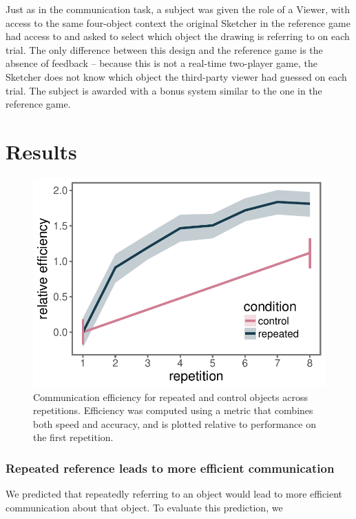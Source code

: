 \documentclass[10pt,letterpaper]{article}
\begin{document}
Just as in the communication task, a subject was given the role of a Viewer, with access to the same four-object context the original Sketcher in the reference game had access to and asked to select which object the drawing is referring to on each trial. 
The only difference between this design and the reference game is the absence of feedback -- because this is not a real-time two-player game, the Sketcher does not know which object the third-party viewer had guessed on each trial. 
The subject is awarded with a bonus system similar to the one in the reference game.

\section{Results}

\begin{figure}
\includegraphics[width=\linewidth]{figures/refgame_BIS_timeseries.pdf}
\caption{Communication efficiency for repeated and control objects across repetitions. Efficiency was computed using a metric that combines both speed and accuracy, and is plotted relative to performance on the first repetition.} \label{refgame_bis}
\end{figure}

\subsubsection{Repeated reference leads to more efficient communication} 
We predicted that repeatedly referring to an object would lead to more efficient communication about that object.
To evaluate this prediction, we 
\end{document}
